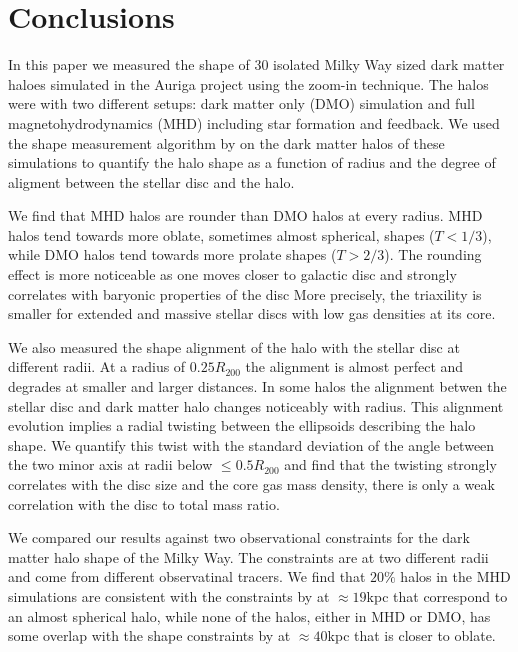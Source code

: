 \documentclass[usenatbib]{mnras}
\begin{document}
\section{Conclusions}
\label{sec:conclusions}

In this paper we measured the shape of 30 isolated Milky Way sized
dark matter haloes simulated in the Auriga project using the zoom-in
technique. 
The halos were with two different setups:
dark matter only (DMO) simulation and full magnetohydrodynamics (MHD)
including star formation and feedback.
We used the shape measurement algorithm by \cite{Allgood06} on the
dark matter halos of these simulations to quantify the halo shape as a
function of radius and the degree of aligment between the stellar disc
and the halo. 

We find that MHD halos are rounder than DMO halos at every radius.
MHD halos tend towards more oblate, sometimes almost spherical, shapes
($T<1/3$), while DMO halos tend towards more prolate shapes ($T>2/3$).  
The rounding effect is more noticeable as one moves closer to galactic
disc and strongly  correlates with baryonic properties of the disc
More precisely, the triaxility is smaller for extended and massive
stellar discs with low gas densities at its core.

We also measured the shape alignment of the halo with the stellar
disc at different radii.
At a radius of $0.25R_{200}$ the alignment is almost perfect and
degrades at smaller and larger distances.
In some halos the alignment betwen the stellar disc and dark matter
halo changes noticeably with radius. 
This alignment evolution implies a radial twisting between the ellipsoids
describing the halo shape. 
We quantify this twist with the standard deviation of the angle
between the two minor axis at radii below $\leq 0.5R_{200}$ and find
that the twisting strongly correlates with the disc size and the core
gas mass density, there is only a weak correlation with the disc to
total mass ratio.

We compared our results against two observational constraints for the
dark matter halo shape of the Milky Way. 
The constraints are at two different radii and come from different
observatinal tracers. 
We find that $20\%$ halos in the MHD simulations are consistent with
the constraints by \cite{Bovy16} at $\approx 19$kpc that correspond to
an almost spherical halo, while none of the halos, either in MHD or
DMO, has some overlap with the shape constraints by \cite{LM10} at
$\approx 40$kpc that is closer to oblate.  
\end{document}
